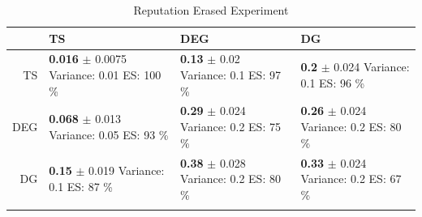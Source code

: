 \documentclass{article}
\theoremstyle{definition}
\begin{document}
\begin{table}[ht]
\centering
\caption{Reputation Erased Experiment} 
\begin{tabular}{rlll}
  \hline
 & TS & DEG &  DG \\ 
  \hline
TS & \makecell{\textbf{ 0.016 } $\pm$ 0.0075 \\Variance: 0.01 \\ ES: 100 \%} & \makecell{\textbf{ 0.13 } $\pm$ 0.02 \\Variance: 0.1 \\ ES: 97 \%} & \makecell{\textbf{ 0.2 } $\pm$ 0.024 \\Variance: 0.1 \\ ES: 96 \%} \\ 
  DEG & \makecell{\textbf{ 0.068 } $\pm$ 0.013 \\Variance: 0.05 \\ ES: 93 \%} & \makecell{\textbf{ 0.29 } $\pm$ 0.024 \\Variance: 0.2 \\ ES: 75 \%} & \makecell{\textbf{ 0.26 } $\pm$ 0.024 \\Variance: 0.2 \\ ES: 80 \%} \\ 
   DG & \makecell{\textbf{ 0.15 } $\pm$ 0.019 \\Variance: 0.1 \\ ES: 87 \%} & \makecell{\textbf{ 0.38 } $\pm$ 0.028 \\Variance: 0.2 \\ ES: 80 \%} & \makecell{\textbf{ 0.33 } $\pm$ 0.024 \\Variance: 0.2 \\ ES: 67 \%} \\ 
   \hline
   \label{rep_erase}
\end{tabular}
\end{table}
\end{document}
